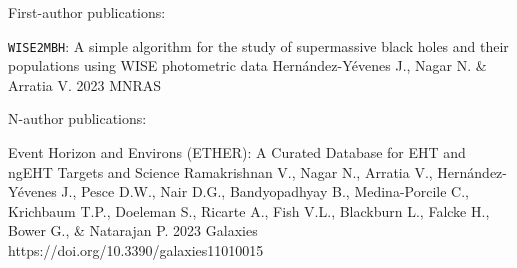 
\begin{cvpublications}{First-author publications:}

	 {\texttt{WISE2MBH}: A simple algorithm for the study of supermassive black holes and their populations using WISE photometric data}
	 {Hernández-Yévenes J., Nagar N. \& Arratia V.}
	 {2023}
     {MNRAS}
     {}
     

\end{cvpublications}

\begin{cvpublications}{N-author publications:}

	{Event Horizon and Environs (ETHER): A Curated Database for EHT and ngEHT Targets and Science}
	{Ramakrishnan V., Nagar N., Arratia V., Hernández-Yévenes J., Pesce D.W., Nair D.G., Bandyopadhyay B., Medina-Porcile C.,  Krichbaum T.P., Doeleman S., Ricarte A., Fish V.L., Blackburn L., Falcke H., Bower G., \& Natarajan P.}
    {2023}
	{Galaxies}
    {https://doi.org/10.3390/galaxies11010015}

\end{cvpublications}
